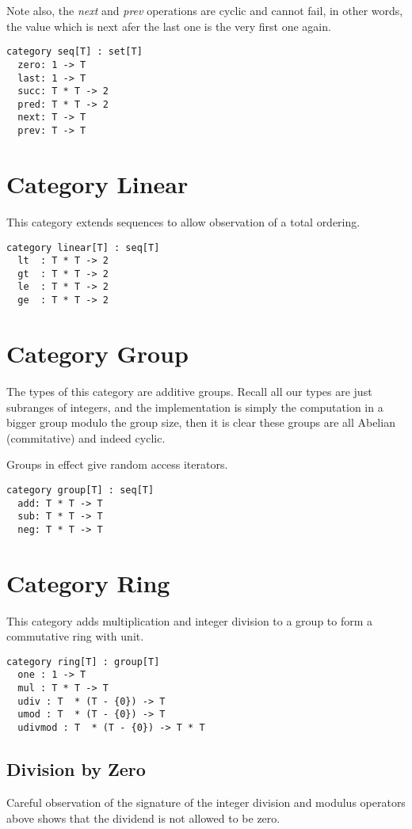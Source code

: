 Note also, the {\em next} and {\em prev} operations are cyclic and
cannot fail, in other words, the value which is next afer the last
one is the very first one again.

\begin{verbatim}
category seq[T] : set[T]
  zero: 1 -> T
  last: 1 -> T
  succ: T * T -> 2
  pred: T * T -> 2
  next: T -> T
  prev: T -> T
\end{verbatim}

\section{Category Linear}
This category extends sequences to allow observation of a total ordering.

\begin{verbatim}
category linear[T] : seq[T]
  lt  : T * T -> 2
  gt  : T * T -> 2
  le  : T * T -> 2
  ge  : T * T -> 2
\end{verbatim}

\section{Category Group}
The types of this category are additive groups. Recall all our types are
just subranges of integers, and the implementation is simply the
computation in a bigger group modulo the group size, then it is clear
these groups are all Abelian (commitative) and indeed cyclic.

Groups in effect give random access iterators.

\begin{verbatim}
category group[T] : seq[T]
  add: T * T -> T
  sub: T * T -> T
  neg: T * T -> T
\end{verbatim}

\section{Category Ring}
This category adds multiplication and integer division to a group
to form a commutative ring with unit.

\begin{verbatim}
category ring[T] : group[T]
  one : 1 -> T
  mul : T * T -> T
  udiv : T  * (T - {0}) -> T
  umod : T  * (T - {0}) -> T
  udivmod : T  * (T - {0}) -> T * T
\end{verbatim}

\subsection{Division by Zero}
Careful observation of the signature of the integer division and modulus
operators above shows that the dividend is not allowed to be zero.

